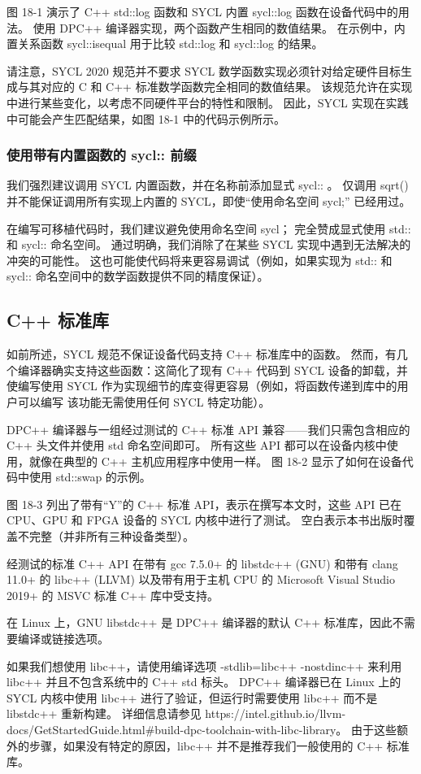 图 18-1 演示了 C++ std::log 函数和 SYCL 内置 sycl::log 函数在设备代码中的用法。 使用 DPC++ 编译器实现，两个函数产生相同的数值结果。 在示例中，内置关系函数 sycl::isequal 用于比较 std::log 和 sycl::log 的结果。

请注意，SYCL 2020 规范并不要求 SYCL 数学函数实现必须针对给定硬件目标生成与其对应的 C 和 C++ 标准数学函数完全相同的数值结果。 该规范允许在实现中进行某些变化，以考虑不同硬件平台的特性和限制。 因此，SYCL 实现在实践中可能会产生匹配结果，如图 18-1 中的代码示例所示。

\subsubsection{使用带有内置函数的 sycl:: 前缀}
我们强烈建议调用 SYCL 内置函数，并在名称前添加显式 sycl:: 。 仅调用 sqrt() 并不能保证调用所有实现上内置的 SYCL，即使“使用命名空间 sycl;” 已经用过。

在编写可移植代码时，我们建议避免使用命名空间 sycl； 完全赞成显式使用 std:: 和 sycl:: 命名空间。 通过明确，我们消除了在某些 SYCL 实现中遇到无法解决的冲突的可能性。 这也可能使代码将来更容易调试（例如，如果实现为 std:: 和 sycl:: 命名空间中的数学函数提供不同的精度保证）。

\subsection{C++ 标准库}
如前所述，SYCL 规范不保证设备代码支持 C++ 标准库中的函数。 然而，有几个编译器确实支持这些函数：这简化了现有 C++ 代码到 SYCL 设备的卸载，并使编写使用 SYCL 作为实现细节的库变得更容易（例如，将函数传递到库中的用户可以编写 该功能无需使用任何 SYCL 特定功能）。

DPC++ 编译器与一组经过测试的 C++ 标准 API 兼容——我们只需包含相应的 C++ 头文件并使用 std 命名空间即可。 所有这些 API 都可以在设备内核中使用，就像在典型的 C++ 主机应用程序中使用一样。 图 18-2 显示了如何在设备代码中使用 std::swap 的示例。

图 18-3 列出了带有“Y”的 C++ 标准 API，表示在撰写本文时，这些 API 已在 CPU、GPU 和 FPGA 设备的 SYCL 内核中进行了测试。 空白表示本书出版时覆盖不完整（并非所有三种设备类型）。

经测试的标准 C++ API 在带有 gcc 7.5.0+ 的 libstdc++ (GNU) 和带有 clang 11.0+ 的 libc++ (LLVM) 以及带有用于主机 CPU 的 Microsoft Visual Studio 2019+ 的 MSVC 标准 C++ 库中受支持。

在 Linux 上，GNU libstdc++ 是 DPC++ 编译器的默认 C++ 标准库，因此不需要编译或链接选项。

如果我们想使用 libc++，请使用编译选项 -stdlib=libc++ -nostdinc++ 来利用 libc++ 并且不包含系统中的 C++ std 标头。 DPC++ 编译器已在 Linux 上的 SYCL 内核中使用 libc++ 进行了验证，但运行时需要使用 libc++ 而不是 libstdc++ 重新构建。 详细信息请参见 https://intel.github.io/llvm-docs/GetStartedGuide.html\#build-dpc-toolchain-with-libc-library。 由于这些额外的步骤，如果没有特定的原因，libc++ 并不是推荐我们一般使用的 C++ 标准库。


